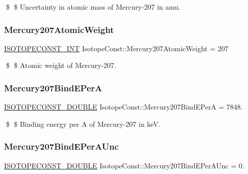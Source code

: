 \$ \$ Uncertainty in atomic mass of Mercury-\/207 in amu. \mbox{\label{group___isotope_const-_mercury-_hg207_ga92f00366cfbdad2f19e7edab814bdfdd}} 
\subsubsection{\texorpdfstring{Mercury207\+Atomic\+Weight}{Mercury207AtomicWeight}}
{\footnotesize\ttfamily \mbox{\hyperlink{group___isotope_const-_macros_ga5f18360b3e99483a35c32d789e62621c}{I\+S\+O\+T\+O\+P\+E\+C\+O\+N\+S\+T\+\_\+\+I\+NT}} Isotope\+Const\+::\+Mercury207\+Atomic\+Weight = 207}

\$ \$ Atomic weight of Mercury-\/207. \mbox{\label{group___isotope_const-_mercury-_hg207_ga6a2fea0b7dfda1df65f4cd25c7525b78}} 
\subsubsection{\texorpdfstring{Mercury207\+Bind\+E\+PerA}{Mercury207BindEPerA}}
{\footnotesize\ttfamily \mbox{\hyperlink{group___isotope_const-_macros_ga8f45a7272ce02c0b4c65c44636ed719a}{I\+S\+O\+T\+O\+P\+E\+C\+O\+N\+S\+T\+\_\+\+D\+O\+U\+B\+LE}} Isotope\+Const\+::\+Mercury207\+Bind\+E\+PerA = 7848.}

\$ \$ Binding energy per A of Mercury-\/207 in keV. \mbox{\label{group___isotope_const-_mercury-_hg207_ga0c4fca903d9a0c0de09c47fad086ed7d}} 
\subsubsection{\texorpdfstring{Mercury207\+Bind\+E\+Per\+A\+Unc}{Mercury207BindEPerAUnc}}
{\footnotesize\ttfamily \mbox{\hyperlink{group___isotope_const-_macros_ga8f45a7272ce02c0b4c65c44636ed719a}{I\+S\+O\+T\+O\+P\+E\+C\+O\+N\+S\+T\+\_\+\+D\+O\+U\+B\+LE}} Isotope\+Const\+::\+Mercury207\+Bind\+E\+Per\+A\+Unc = 0.}

